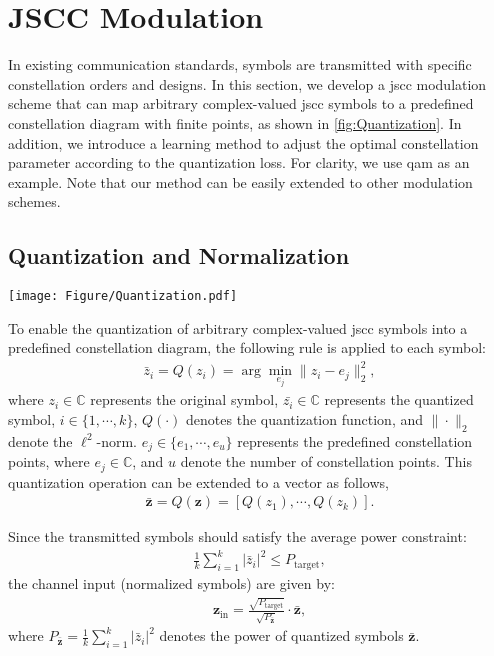 \section{JSCC Modulation}
\label{sec:modulation}
In existing communication standards, symbols are transmitted with specific constellation orders and designs.  
In this section, we develop a \gls{jscc} modulation scheme that can map arbitrary complex-valued \gls{jscc} symbols to a predefined constellation diagram with finite points, as shown in \cref{fig:Quantization}. In addition, we introduce a learning method to adjust the optimal constellation parameter according to the quantization loss. For clarity, we use \gls{qam} as an example. Note that our method can be easily extended to other modulation schemes.

\subsection{Quantization and Normalization}
\begin{figure*}[t]
    \begin{center}
    \texttt{[image: Figure/Quantization.pdf]}
    \end{center}
       \caption{An example of the JSCC modulation and signal transmission procedure for $\bm{z} \in \mathbb{C}^4$ using 16-QAM.}
    \label{fig:Quantization}
\end{figure*}
To enable the quantization of arbitrary complex-valued \gls{jscc} symbols into a predefined constellation diagram, the following rule is applied to each symbol:
\begin{align}
    \bar{z}_i=Q(z_i)=\arg\mathop{\min}_{e_j}\|z_i-e_j \|_2^2,
    \label{eq_quantization}
\end{align}
where $z_i \in \mathbb{C}$ represents the original symbol, $\bar{z_i} \in \mathbb{C}$ represents the quantized symbol, $i\in \{1, \cdots,k \}$, $Q(\cdot)$ denotes the quantization function, and $\|\cdot \|_2$ denote the $\ell^2$-norm. $e_j \in \{e_1, \cdots,e_u\}$ represents the predefined constellation points, where $e_j\in \mathbb{C}$, and $u$ denote the number of constellation points. This quantization operation can be extended to a vector as follows,
\begin{align}
    \bar{\bm{z}}=Q(\bm{z})=[Q(z_1), \cdots, Q(z_k)].
    \label{eq_quantization_vector}
\end{align}

Since the transmitted symbols should satisfy the average power constraint:
\begin{align}
    \frac{1}{k}\sum_{i=1}^{k} |\bar{z}_i|^2 \leq P_{\text{target}},
\end{align}
the channel input (normalized symbols) are given by:
\begin{align}
\bm{z}_\text{in} = \frac{\sqrt{P_{\text{target}}}}{\sqrt{P_{\bar{\bm{z}}}}}\cdot\bar{\bm{z}},
\end{align}
where $P_{\bar{\bm{z}}} = \frac{1}{k} \sum_{i=1}^{k} |\bar{z}_i|^2$ denotes the power of quantized symbols $\bar{\bm{z}}$.

